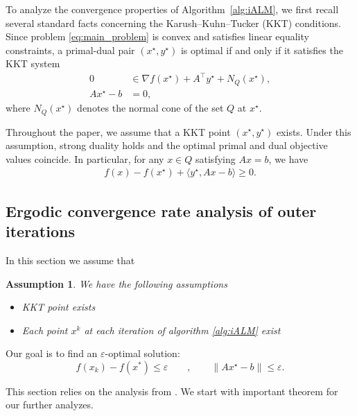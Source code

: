 \documentclass[runningheads]{llncs}
\newtheorem{assumption}{Assumption}
\begin{document}
	To analyze the convergence properties of Algorithm~\ref{alg:iALM}, we first recall several standard facts concerning the Karush--Kuhn--Tucker (KKT) conditions. Since problem \eqref{eq:main_problem} is convex and satisfies linear equality constraints, a primal-dual pair $(x^\star,y^\star)$ is optimal if and only if it satisfies the KKT system
	\begin{align}
		0 &\in \nabla f(x^\star) + A^\top y^\star + N_Q(x^\star),
		\label{eq:kkt_stationarity}\\
		Ax^\star-b &= 0,
		\label{eq:kkt_feasibility}
	\end{align}
	where $N_Q(x^\star)$ denotes the normal cone of the set $Q$ at $x^\star$.
	
	Throughout the paper, we assume that a KKT point $(x^\star,y^\star)$ exists. Under this assumption, strong duality holds and the optimal primal and dual objective values coincide. In particular, for any $x \in Q$ satisfying $Ax=b$, we have
	\begin{align}\label{eq:kkt_conv}
		f(x)-f(x^\star) + \langle y^\star,Ax-b\rangle \geq 0.
	\end{align}
	
	\subsection{Ergodic convergence rate analysis of outer iterations}
	
	In this section we assume that
	\begin{assumption}\label{assum:conv}
		We have the following assumptions
		\begin{itemize}
			\item KKT point exists
			\item Each point $x^k$ at each iteration of algorithm \ref{alg:iALM} exist
		\end{itemize}
	\end{assumption}
	
	Our goal is to find an $\varepsilon$-optimal solution:
	\begin{equation}
		f(x_k) - f(x^*) \leq \varepsilon \quad \quad, \quad \quad \| Ax^\star-b \| \leq \varepsilon.
	\end{equation}
	
	This section relies on the analysis from \cite{xu2021iteration}. We start with important theorem for our further analyzes.
	
\end{document}
